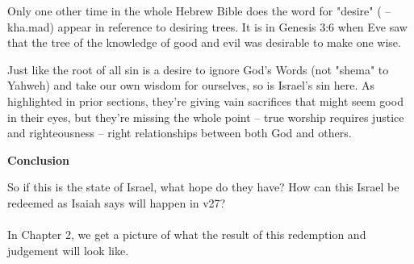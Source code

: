 \documentclass[11pt]{article}
\begin{document}
Only one other time in the whole Hebrew Bible does the word for "desire" ( – kha.mad) appear in reference to desiring trees.
It is in Genesis 3:6 when Eve saw that the tree of the knowledge of good and evil was desirable to make one wise.

{\vspace{1em}}
Just like the root of all sin is a desire to ignore God's Words (not "shema" to Yahweh) and take our own wisdom for ourselves,
so is Israel's sin here. As highlighted in prior sections, they're giving vain sacrifices that might seem good in their eyes,
but they're missing the whole point – true worship requires justice and righteousness – right relationships between both God and others.

{\vspace{2em}}
{\large\bfseries Conclusion}
{\vspace{1em}}

So if this is the state of Israel, what hope do they have? How can this Israel be redeemed as Isaiah says will happen in v27?
\\\\
In Chapter 2, we get a picture of what the result of this redemption and judgement will look like.

\begin{thesauce}

    


\end{thesauce}
\end{document}
